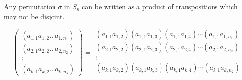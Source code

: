 \begin{theorem}\label{thm:decomposition-into-transpositions}
	Any permutation $\sigma$ in $S_n$ can be written as a product of transpositions
	which may not be disjoint.
\end{theorem}

$$ 
\left( 
	\begin{array}{c}
		(a_{1,1} a_{1,2} \dotsc a_{1,n_1})\\
		(a_{2,1}  a_{2,2} \dotsc a_{2,n_2})\\
		\vdots \\
		(a_{k,1} a_{k,2} \dotsc a_{k,n_k}) 
	\end{array}
	\right)
	= \begin{array}{c}
		(a_{1,1} a_{1,2}) (a_{1,1} a_{1,3}) (a_{1,1} a_{1,4}) \cdots (a_{1,1} a_{1,n_1})\\
		(a_{2,1} a_{2,2}) (a_{2,1} a_{2,3}) (a_{2,1} a_{2,4}) \cdots (a_{2,1} a_{2,n_2}) \\
		 \vdots \\
		 (a_{k,1} a_{k,2}) (a_{k,1} a_{k,3}) (a_{k,1} a_{k,4}) \cdots (a_{k,1} a_{k,n_2}) \\
	\end{array}
	$$
